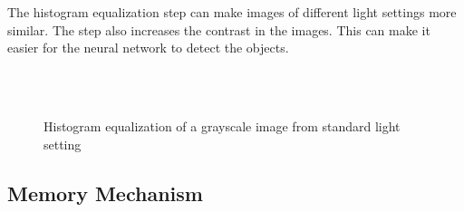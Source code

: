 The histogram equalization step can make images of different light settings more similar. The step also increases the contrast in the images. This can make it easier for the neural network to detect the objects.

\begin{figure}
    \centering
    \\
    \\
    \caption{Histogram equalization of a grayscale image from standard light setting}
    \label{fig:histogram_equalization}
\end{figure}


\subsection{Memory Mechanism}

